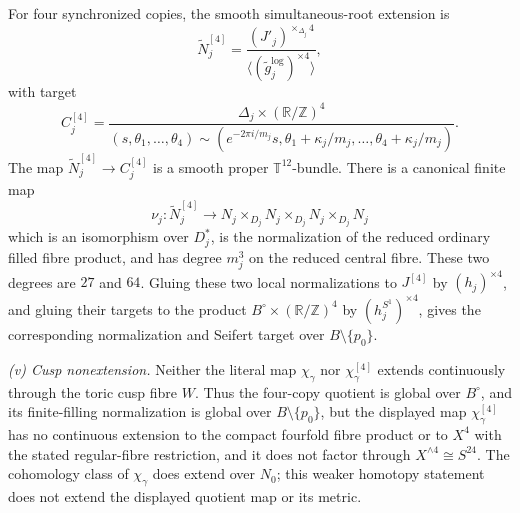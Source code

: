 \begin{theorem}
For four synchronized copies, the smooth simultaneous-root extension is
\begin{equation}
 \widetilde N_j^{[4]}
 =\frac{(J'_j)^{\times_{\Delta_j}4}}
 {\langle(\widetilde g_j^{\log})^{\times4}\rangle},
 \label{wb:cusp-spec-finite-fourfold-normalization}
\end{equation}
with target
\begin{equation}
 C_j^{[4]}=
 \frac{\Delta_j\times(\mathbb R/\mathbb Z)^4}
 {(s,\theta_1,\ldots,\theta_4)\sim
  (e^{-2\pi i/m_j}s,
   \theta_1+\kappa_j/m_j,\ldots,\theta_4+\kappa_j/m_j)}.
 \label{wb:cusp-spec-finite-fourfold-target}
\end{equation}
The map \(\widetilde N_j^{[4]}\to C_j^{[4]}\) is a smooth proper
\(\mathbb T^{12}\)-bundle.  There is a canonical finite map
\begin{equation}
 \nu_j:\widetilde N_j^{[4]}
 \longrightarrow N_j\times_{D_j}N_j\times_{D_j}N_j\times_{D_j}N_j
 \label{wb:cusp-spec-finite-normalization-map}
\end{equation}
which is an isomorphism over \(D_j^*\), is the normalization of the
reduced ordinary filled fibre product, and has degree \(m_j^3\) on the
reduced central fibre.  These two degrees are \(27\) and \(64\).  Gluing
these two local normalizations to \(J^{[4]}\) by
\((h_j)^{\times4}\), and gluing their targets to the product
\(B^\circ\times(\mathbb R/\mathbb Z)^4\) by
\((h_j^{S^1})^{\times4}\), gives the corresponding normalization and
Seifert target over \(B\setminus\{p_0\}\).

\smallskip
\noindent
\emph{(v) Cusp nonextension.}
Neither the literal map \(\chi_\gamma\) nor
\(\chi_\gamma^{[4]}\) extends continuously through the toric cusp fibre
\(W\).  Thus the four-copy quotient is global over \(B^\circ\), and its
finite-filling normalization is global over \(B\setminus\{p_0\}\), but
the displayed map \(\chi_\gamma^{[4]}\) has no continuous extension to
the compact fourfold fibre product or to \(X^4\) with the stated
regular-fibre restriction, and it does not factor through
\(X^{\wedge4}\cong S^{24}\).  The cohomology class of
\(\chi_\gamma\) does extend over
\(N_0\); this weaker homotopy statement does not extend the displayed
quotient map or its metric.


\end{theorem}
